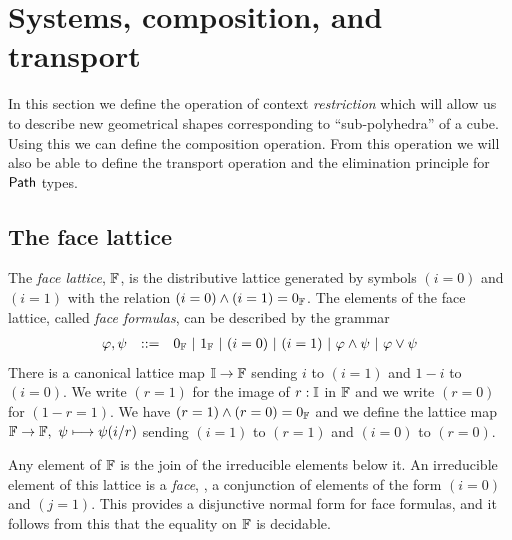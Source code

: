 \section{Systems, composition, and transport}\label{sec:compositions}

In this section we define the operation of context \emph{restriction}
which will allow us to describe new geometrical shapes corresponding
to ``sub-polyhedra'' of a cube. Using this we can define the
composition operation. From this operation we will also be able to
define the transport operation and the elimination principle for
${\sf Path}$ types.

\subsection{The face lattice}

The {\em face lattice}, $\mathbb{F}$, is the distributive lattice generated
by symbols $(i = 0)$ and $(i = 1)$ with the relation $(i = 0) \wedge
(i = 1) = 0_{\mathbb{F}}$. The elements of the face lattice, called \emph{face
  formulas}, can be described by the grammar
%
\[
\begin{array}{lcl}
  \varphi,\psi & ::= & 0_{\mathbb{F}} {~\mid~} 1_{\mathbb{F}} {~\mid~} (i = 0) {~\mid~} (i = 1)
                    {~\mid~} \varphi \land \psi {~\mid~} \varphi \lor \psi \\
\end{array}
\]
%
There is a canonical lattice map $\mathbb{I} \rightarrow \mathbb{F}$ sending $i$ to
$(i=1)$ and $1-i$ to $(i=0)$. We write $(r=1)$ for the image of $r :
\mathbb{I}$ in $\mathbb{F}$ and we write $(r=0)$ for $(1-r = 1)$. We have $(r=1)
\wedge (r=0) = 0_{\mathbb{F}}$ and we define the lattice map $\mathbb{F} \rightarrow
\mathbb{F},~\psi\longmapsto \psi (i/r)$ sending $(i=1)$ to $(r=1)$ and
$(i=0)$ to $(r=0)$.

\medskip

Any element of $\mathbb{F}$ is the join of the irreducible elements below
it. An irreducible element of this lattice is a \emph{face}, \ie{}, a
conjunction of elements of the form $(i = 0)$ and $(j = 1)$. This
provides a disjunctive normal form for face formulas, and it follows
from this that the equality on $\mathbb{F}$ is decidable.

